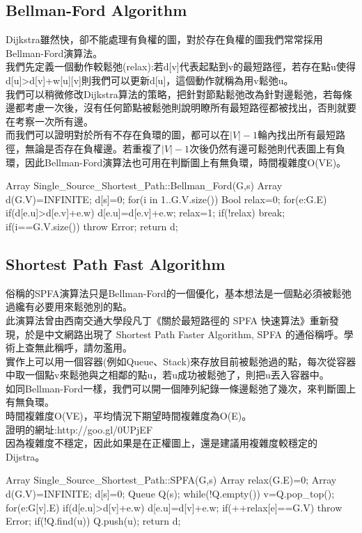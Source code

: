 \documentclass{article}
\begin{document}
\subsection{Bellman-Ford Algorithm}
Dijkstra雖然快，卻不能處理有負權的圖，對於存在負權的圖我們常常採用Bellman-Ford演算法。\\
我們先定義一個動作較鬆弛(relax):若d[v]代表起點到v的最短路徑，若存在點u使得d[u]>d[v]+w[u][v]則我們可以更新d[u]，這個動作就稱為用v鬆弛u。\\
我們可以稍微修改Dijkstra算法的策略，把針對節點鬆弛改為針對邊鬆弛，若每條邊都考慮一次後，沒有任何節點被鬆弛則說明瞭所有最短路徑都被找出，否則就要在考察一次所有邊。\\
而我們可以證明對於所有不存在負環的圖，都可以在$|V|-1$輪內找出所有最短路徑，無論是否存在負權邊。若重複了$|V|-1$次後仍然有邊可鬆弛則代表圖上有負環，因此Bellman-Ford演算法也可用在判斷圖上有無負環，時間複雜度O(VE)。\\
\newpage
\begin{algorithm}[caption={Bellman-Ford Algorithm}, label={alg1}]
Array Single_Source_Shortest_Path::Bellman_Ford(G,s)
    Array d(G.V)=INFINITE;
    d[s]=0;
    for(i in 1..G.V.size())
        Bool relax=0;
        for(e:G.E)
            if(d[e.u]>d[e.v]+e.w)
                d[e.u]=d[e.v]+e.w;
                relax=1;
        if(!relax)
            break;
        if(i==G.V.size())
            throw Error;
    return d;
\end{algorithm}    
\subsection{Shortest Path Fast Algorithm}
俗稱的SPFA演算法只是Bellman-Ford的一個優化，基本想法是一個點必須被鬆弛過纔有必要用來鬆弛別的點。\\
此演算法曾由西南交通大學段凡丁《關於最短路徑的 SPFA 快速算法》重新發現，於是中文網路出現了 Shortest Path Faster Algorithm, SPFA 的通俗稱呼。學術上查無此稱呼，請勿濫用。\\
實作上可以用一個容器(例如Queue、Stack)來存放目前被鬆弛過的點，每次從容器中取一個點v來鬆弛與之相鄰的點u，若u成功被鬆弛了，則把u丟入容器中。\\
如同Bellman-Ford一樣，我們可以開一個陣列紀錄一條邊鬆弛了幾次，來判斷圖上有無負環。\\
時間複雜度O(VE)，平均情況下期望時間複雜度為O(E)。\\
證明的網址:http://goo.gl/0UPjEF\\
因為複雜度不穩定，因此如果是在正權圖上，還是建議用複雜度較穩定的Dijstra。\\
\newpage
\begin{algorithm}[caption={Shortest Path Fast Algorithm}, label={alg1}]
Array Single_Source_Shortest_Path::SPFA(G,s)
    Array relax(G.E)=0;
    Array d(G.V)=INFINITE;
    d[s]=0;
    Queue Q(s);
    while(!Q.empty())
        v=Q.pop_top();
        for(e:G[v].E)
            if(d[e.u]>d[v]+e.w)
                d[e.u]=d[v]+e.w;
                if(++relax[e]==G.V)
                    throw Error;
                if(!Q.find(u))
                    Q.push(u);
    return d;
\end{algorithm}
\end{document}
